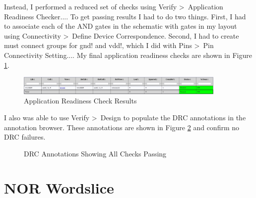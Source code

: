\documentclass{article}
\begin{document}
	\noindent Instead, I performed a reduced set of checks using Verify \textgreater\ Application Readiness Checker.... To get passing results I had to do two things. First, I had to associate each of the AND gates in the schematic with gates in my layout using Connectivity \textgreater\ Define Device Correspondence. Second, I had to create must connect groups for gnd! and vdd!, which I did with Pins \textgreater\ Pin Connectivity Setting.... My final application readiness checks are shown in Figure \ref{fig::and_application_readiness_check}.
	
	\begin{figure}[H]
		\centerline{\includegraphics[width=0.9\textwidth]{and_application_readiness_check.png}}
		\caption{Application Readiness Check Results}
		\label{fig::and_application_readiness_check}
	\end{figure}
	
	\noindent I also was able to use Verify \textgreater\ Design to populate the DRC annotations in the annotation browser. These annotations are shown in Figure \ref{fig::and_drc} and confirm no DRC failures.
	
	\begin{figure}[H]
		\centerline{}
		\caption{DRC Annotations Showing All Checks Passing}
		\label{fig::and_drc}
	\end{figure}
	
	\section{NOR Wordslice}
\end{document}
